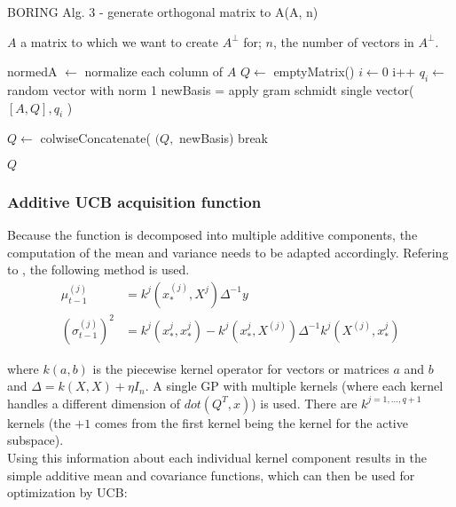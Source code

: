 \begin{algorithm}[H]
\caption{BORING Alg. 3 - generate orthogonal matrix to A(A, n) }

\begin{algorithmic} 
\REQUIRE $A$ a matrix to which we want to create $A^{\bot}$ for; $n$, the number of vectors in $A^{\bot}$.

\STATE normedA $ \leftarrow $ normalize each column of $A$
\STATE $Q \leftarrow$ emptyMatrix()
\STATE $i \leftarrow 0$ 
\STATE i++
\STATE $q_i \leftarrow $ random vector with norm 1
\STATE newBasis = apply gram schmidt single vector( $[A, Q], q_i$ ) 

\STATE $Q \leftarrow$ colwiseConcatenate( $(Q, $ newBasis)
\STATE break
\ENDIF
\ENDWHILE                
\ENDFOR

\RETURN $Q$
\end{algorithmic}
\end{algorithm}

\subsubsection{Additive UCB acquisition function}

Because the function is decomposed into multiple additive components, the computation of the mean and variance needs to be adapted accordingly.
Refering to \citep{Rolland}, the following method is used. \\

\begin{align}
\mu_{t-1}^{(j)} &= k^j(x_*^{(j)}, X^j)\Delta^{-1}y \\
\left( \sigma_{t-1}^{(j)} \right)^2 &= k^j(x_*^{j}, x_*^{j}) - k^j(x_*^j, X^{(j)}) \Delta^{-1} k^j(X^{(j)}, x_*^j)
\end{align}

where $k(a, b)$ is the piecewise kernel operator for vectors or matrices $a$ and $b$ and $\Delta = k(X, X) + \eta I_n$.
A single GP with multiple kernels (where each kernel handles a different dimension of $dot(Q^T, x)$) is used.
There are $k^{j=1, \ldots, q+1}$ kernels (the $+1$ comes from the first kernel being the kernel for the active subspace). \\

Using this information about each individual kernel component results in the simple additive mean and covariance functions, which can then be used for optimization by UCB:

